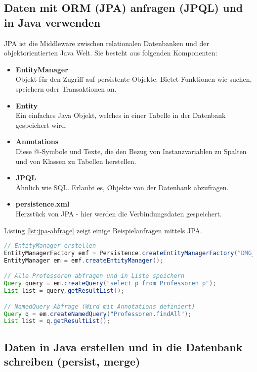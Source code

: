 \subsection{Daten mit ORM (JPA) anfragen (JPQL) und in Java verwenden}

JPA ist die Middleware zwischen relationalen Datenbanken und der objektorientierten Java Welt. Sie besteht aus folgenden Komponenten:

\begin{itemize}
  \item \textbf{EntityManager} \\
  Objekt für den Zugriff auf persistente Objekte. Bietet Funktionen wie suchen, speichern oder Transaktionen an.
  \item \textbf{Entity} \\
  Ein einfaches Java Objekt, welches in einer Tabelle in der Datenbank gespeichert wird.
  \item \textbf{Annotations} \\
  Diese @-Symbole und Texte, die den Bezug von Instanzvariablen zu Spalten und von Klassen zu Tabellen herstellen.
  \item \textbf{JPQL}  \\
  Ähnlich wie SQL. Erlaubt es, Objekte von der Datenbank abzufragen.
  \item \textbf{persistence.xml} \\
  Herzstück von JPA - hier werden die Verbindungsdaten gespeichert.
\end{itemize}

\newpage

Listing \ref{lst:jpa-abfrage} zeigt einige Beispielanfragen mittels JPA.

\begin{lstlisting}[language=Java,keywordstyle=\color{keywordcolor},caption={JPA Grundlagen in Java},label=lst:jpa-abfrage]
// EntityManager erstellen
EntityManagerFactory emf = Persistence.createEntityManagerFactory("DMG_OOPU");
EntityManager em = emf.createEntityManager();

// Alle Professoren abfragen und in Liste speichern
Query query = em.createQuery("select p from Professoren p");
List list = query.getResultList();

// NamedQuery-Abfrage (Wird mit Annotations definiert)
Query q = em.createNamedQuery("Professoren.findAll");
List list = q.getResultList();
\end{lstlisting}

\subsection{Daten in Java erstellen und in die Datenbank schreiben (persist, merge)}

